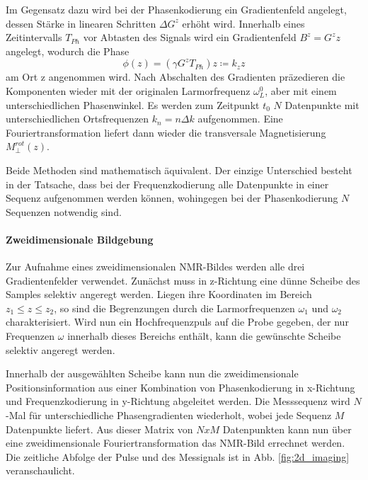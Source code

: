 \documentclass[a4paper]{scrartcl} %
\begin{document}
Im Gegensatz dazu wird bei der Phasenkodierung ein Gradientenfeld angelegt, dessen Stärke in linearen Schritten $\Delta G^z$ erhöht wird. Innerhalb eines Zeitintervalls $T_{Ph}$ vor Abtasten des Signals wird ein Gradientenfeld $B^z = G^z z$ angelegt, wodurch die Phase
\begin{equation}
\phi (z) = (\gamma G^z T_{Ph})z \coloneqq k_z z
\end{equation}
am Ort z angenommen wird. Nach Abschalten des Gradienten präzedieren die Komponenten wieder mit der originalen Larmorfrequenz $\omega_{L}^0$, aber mit einem unterschiedlichen Phasenwinkel. Es werden zum Zeitpunkt $t_0$ $N$ Datenpunkte mit unterschiedlichen Ortsfrequenzen $k_n=n\Delta k$ aufgenommen. Eine Fouriertransformation liefert dann wieder die transversale Magnetisierung $M_{\perp}^{rot}(z)$.

Beide Methoden sind mathematisch äquivalent. Der einzige Unterschied besteht in der Tatsache, dass bei der Frequenzkodierung alle Datenpunkte in einer Sequenz aufgenommen werden können, wohingegen bei der Phasenkodierung $N$ Sequenzen notwendig sind.

\paragraph{Zweidimensionale Bildgebung}

Zur Aufnahme eines zweidimensionalen NMR-Bildes werden alle drei Gradientenfelder verwendet. Zunächst muss in z-Richtung eine dünne Scheibe des Samples selektiv angeregt werden. Liegen ihre Koordinaten im Bereich $z_1 \leq z \leq z_2$, so sind die Begrenzungen durch die Larmorfrequenzen $\omega_1$ und $\omega_2$ charakterisiert. Wird nun ein Hochfrequenzpuls auf die Probe gegeben, der nur Frequenzen $\omega$ innerhalb dieses Bereichs enthält, kann die gewünschte Scheibe selektiv angeregt werden. 

Innerhalb der ausgewählten Scheibe kann nun die zweidimensionale Positionsinformation aus einer Kombination von Phasenkodierung in x-Richtung und Frequenzkodierung in y-Richtung abgeleitet werden. Die Messsequenz wird $N$-Mal für unterschiedliche Phasengradienten wiederholt, wobei jede Sequenz $M$ Datenpunkte liefert. Aus dieser Matrix von $N x M$ Datenpunkten kann nun über eine zweidimensionale Fouriertransformation das NMR-Bild errechnet werden. Die zeitliche Abfolge der Pulse und des Messignals ist in Abb. \ref{fig:2d_imaging} veranschaulicht.
\end{document}
